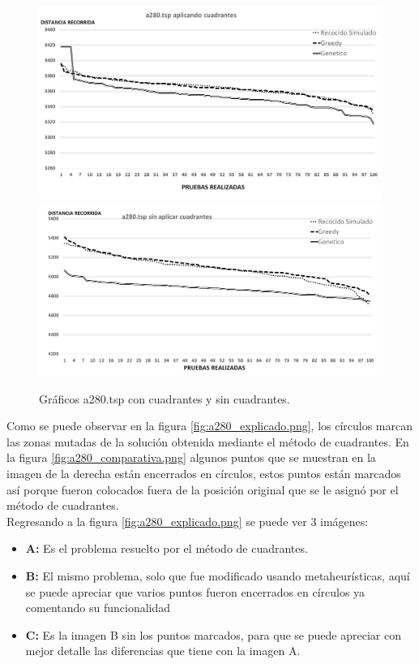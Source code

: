  \begin{figure}[hbtp]
    \centering
        \includegraphics[width=1\textwidth]{PruebasResultados/Experimentos_Graficos_Con/a280.png}
        \includegraphics[width=1\textwidth]{PruebasResultados/Experimentos_Graficos_Sin/a280.png}
        \caption{Gráficos a280.tsp con cuadrantes y sin cuadrantes.}
        \label{fig:a280_grafica.png}
\end{figure}
\newpage

\hspace*{1cm}Como se puede observar en la figura \ref{fig:a280_explicado.png}, los círculos marcan las zonas mutadas de la solución obtenida mediante el método de cuadrantes. En la figura \ref{fig:a280_comparativa.png} algunos puntos que se muestran en la imagen de la derecha están encerrados en círculos, estos puntos están marcados así porque fueron colocados fuera de la posición original que se le asignó por el método de cuadrantes.\\
\hspace*{1cm}Regresando a la figura \ref{fig:a280_explicado.png} se puede ver 3 imágenes:
\begin{itemize}
    \item \textbf{A: }Es el problema resuelto por el método de cuadrantes.
    \item \textbf{B: }El mismo problema, solo que fue modificado usando metaheurísticas, aquí se puede apreciar que varios puntos fueron encerrados en círculos ya comentando su funcionalidad 
    \item \textbf{C: }Es la imagen B sin los puntos marcados, para que se puede apreciar con mejor detalle las diferencias que tiene con la imagen A.
\end{itemize}


